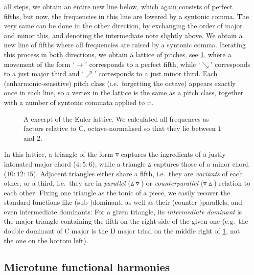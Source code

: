 \documentclass[british,11pt]{scrartcl}
\begin{document}
all steps, we obtain an entire new line below, which again consists of perfect
fifths, but now, the frequencies in this line are lowered by a syntonic comma.
The very same can be done in the other direction, by exchanging the order of
major and minor this, and denoting the intermediate note slightly above.  We
obtain a new line of fifths where all frequencies are raised by a syntonic
comma. Iterating this process in both directions, we obtain a lattice of
pitches, see \cref{fig:latticeExcerpt}, where a movement of the form ‘$\to$’
corresponds to a perfect fifth, while ‘$\searrow$’ corresponds to a just major
third and ‘$\nearrow$’ corresponds to a just minor third. Each
(enharmonic-sensitive) pitch class (i.e.\ forgetting the octave) appears exactly
once in each line, so a vertex in the lattice is the same as a pitch class,
together with a number of syntonic commata applied to it.

\begin{figure}[h]
  
  \caption{A excerpt of the Euler lattice. We calculated all frequences as
    factors relative to C, octave-normalised so that they lie between $1$ and
    $2$.}\label{fig:latticeExcerpt}
\end{figure}

In this lattice, a triangle of the form $\triangledown$ captures the ingredients
of a justly intonated major chord ($4:5:6$), while a triangle $\vartriangle$
captures those of a minor chord ($10:12:15$). Adjacent triangles either share a
fifth, i.e.\ they are \emph{variants} of each other, or a third, i.e.\ they are
in \emph{parallel} ($\vartriangle\!\!\!\triangledown$) or \emph{counterparallel}
($\triangledown\!\!\!\vartriangle$) relation to each other.  Fixing one triangle
as the tonic of a piece, we easily recover the standard functions like
(sub-)dominant, as well as their (counter-)parallels, and even intermediate
dominants: For a given triangle, its \emph{intermediate dominant} is the major
triangle containing the fifth on the right side of the given one (e.g.\ the
double dominant of C major is the D major triad on the middle right of
\cref{fig:latticeExcerpt}, not the one on the bottom left).

\subsection{Microtune functional harmonies}
\end{document}
